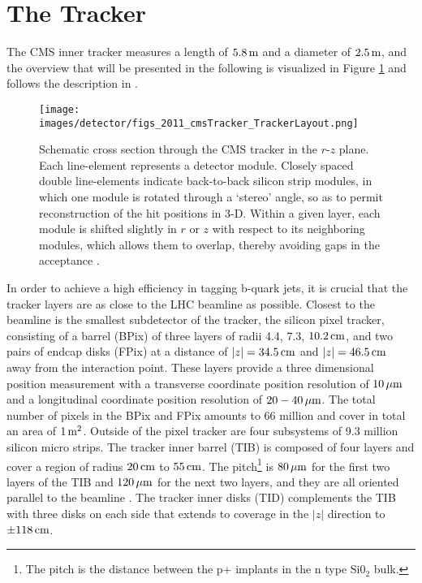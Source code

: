 \section{The Tracker}\label{sec:tracker}
\noindent\justify
The CMS inner tracker measures a length of $5.8\,\text{m}$ and a diameter of $2.5\,\text{m}$, and the overview that will be presented in the following is visualized in Figure \ref{fig:tracker} and follows the description in \cite{Chatrchyan:2014fea}. 
\begin{figure}[!htp]
  \centering
   \texttt{[image: images/detector/figs\_2011\_cmsTracker\_TrackerLayout.png]}
   \caption{Schematic cross section through the CMS tracker in the $r$-$z$ plane. Each line-element represents a detector module. Closely spaced double line-elements indicate back-to-back silicon strip modules, in which one module is rotated through a `stereo' angle, so as to permit reconstruction of the hit positions in 3-D. Within a given layer, each module is shifted slightly in $r$ or $z$ with respect to its neighboring modules, which allows them to overlap, thereby avoiding gaps in the acceptance \cite{Chatrchyan:2014fea}.}
   \label{fig:tracker}
\end{figure}                                                                                            
In order to achieve a high efficiency in tagging b-quark jets, it is crucial that the tracker layers are as close to the LHC beamline as possible. 
Closest to the beamline is the smallest subdetector of the tracker, the silicon pixel tracker, consisting of a barrel (BPix) of three layers of radii 4.4, 7.3, $10.2\,\text{cm}$, and two pairs of endcap disks (FPix) at a distance of $|z|=34.5\,\text{cm}$ and $|z|=46.5\,\text{cm}$ away from the interaction point. 
These layers provide a three dimensional position measurement with a transverse coordinate position resolution of $10\,\mu\text{m}$ and a longitudinal coordinate position resolution of $20-40\,\mu\text{m}$.
The total number of pixels in the BPix and FPix amounts to 66 million and cover in total an area of $1\,\text{m}^{2}$. 
Outside of the pixel tracker are four subsystems of 9.3 million silicon micro strips. 
\newpara
\noindent\justify
The tracker inner barrel (TIB) is composed of four layers and cover a region of radius $20\,\text{cm}$ to $55\,\text{cm}$. 
The pitch\footnote{The pitch is the distance between the p+ implants in the n type $\mathrm{Si0_{2}}$ bulk.} is $80\,\mu\text{m}$ for the first two layers of the TIB and $120\,\mu\text{m}$ for the next two layers, and they are all oriented parallel to the beamline \cite{DAlfonso:2009vko}.
The tracker inner disks (TID) complements the TIB with three disks on each side that extends to coverage in the $|z|$ direction to $\pm118\,\text{cm}$. 

